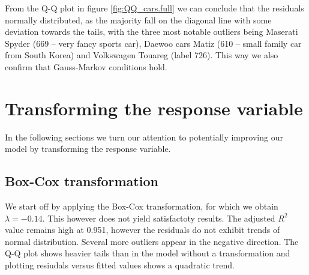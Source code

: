 \documentclass[12pt]{article}
\begin{document}
From the Q-Q plot in figure \ref{fig:QQ_cars.full} we can conclude that the residuals normally distributed, as the majority fall on the 
diagonal line with some deviation towards the tails, with the three most notable outliers being Maserati Spyder (669 -- very fancy sports car),
Daewoo cars Matiz (610 -- small family car from South Korea) and Volkswagen Touareg (label 726).
This way we also confirm that Gauss-Markov conditions hold.

\section{Transforming the response variable}
In the following sections we turn our attention to potentially improving our model by transforming the response variable.
\subsection{Box-Cox transformation}\label{boxCoxTrans}
We start off
by applying the Box-Cox transformation, for which we obtain $\lambda = -0.14.$ This however does not yield satisfactoty results. The
adjusted $R^2$ value remains high at 0.951, however the residuals do not exhibit trends of normal distribution. Several more outliers 
appear in the negative direction. The Q-Q plot shows heavier tails than in the model without a transformation and plotting
resiudals versus fitted values shows a quadratic trend.
\end{document}
